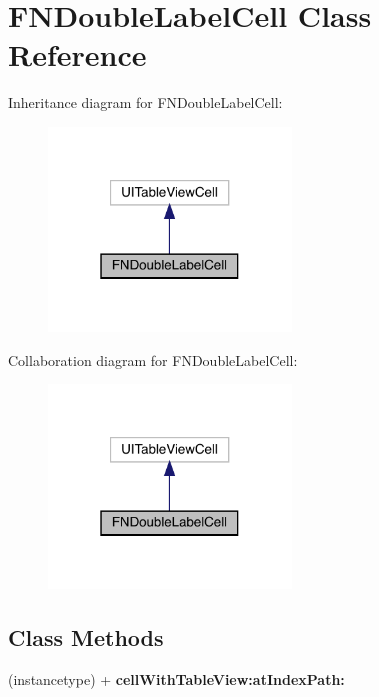 \hypertarget{interface_f_n_double_label_cell}{}\section{F\+N\+Double\+Label\+Cell Class Reference}
\label{interface_f_n_double_label_cell}


Inheritance diagram for F\+N\+Double\+Label\+Cell\+:\nopagebreak
\begin{figure}[H]
\begin{center}
\leavevmode
\includegraphics[width=183pt]{interface_f_n_double_label_cell__inherit__graph}
\end{center}
\end{figure}


Collaboration diagram for F\+N\+Double\+Label\+Cell\+:\nopagebreak
\begin{figure}[H]
\begin{center}
\leavevmode
\includegraphics[width=183pt]{interface_f_n_double_label_cell__coll__graph}
\end{center}
\end{figure}
\subsection*{Class Methods}
\begin{DoxyCompactItemize}
\item 
\mbox{\label{interface_f_n_double_label_cell_a3e32df5b879341ad98c8f52f55d19d12}} 
(instancetype) + {\bfseries cell\+With\+Table\+View\+:at\+Index\+Path\+:}
\end{DoxyCompactItemize}
